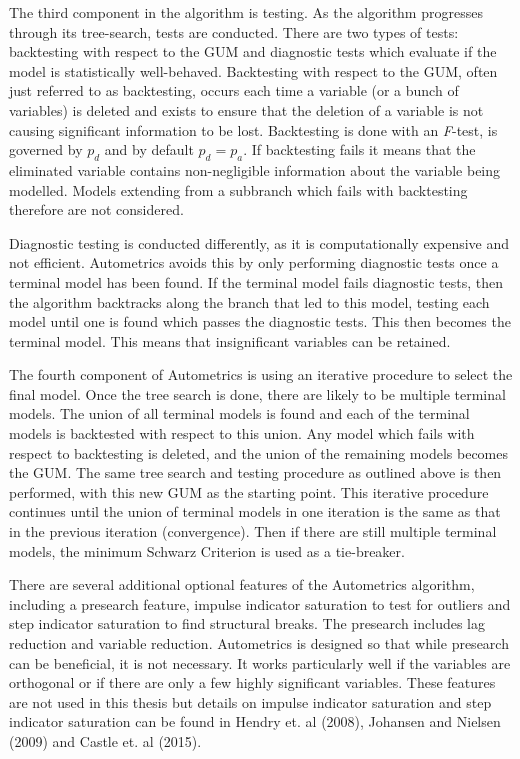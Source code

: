The third component in the algorithm is testing. As the algorithm progresses through its tree-search, tests are conducted. There are two types of tests: backtesting with respect to the GUM and diagnostic tests which evaluate if the model is statistically well-behaved. Backtesting with respect to the GUM, often just referred to as backtesting, occurs each time a variable (or a bunch of variables) is deleted and exists to ensure that the deletion of a variable is not causing significant information to be lost. Backtesting is done with an \textit{F}-test, is governed by $p_{d}$ and by default $p_{d} = p_{a}$. If backtesting fails it means that the eliminated variable contains non-negligible information about the variable being modelled. Models extending from a subbranch which fails with backtesting therefore are not considered.


Diagnostic testing is conducted differently, as it is computationally expensive and not efficient. Autometrics avoids this by only performing diagnostic tests once a terminal model has been found. If the terminal model fails diagnostic tests, then the algorithm backtracks along the branch that led to this model, testing each model until one is found which passes the diagnostic tests. This then becomes the terminal model. This means that insignificant variables can be retained.

The fourth component of Autometrics is using an iterative procedure to select the final model. Once the tree search is done, there are likely to be multiple terminal models. The union of all terminal models is found and each of the terminal models is backtested with respect to this union. Any model which fails with respect to backtesting is deleted, and the union of the remaining models becomes the GUM. The same tree search and testing procedure as outlined above is then performed, with this new GUM as the starting point. This iterative procedure continues until the union of terminal models in one iteration is the same as that in the previous iteration (convergence). Then if there are still multiple terminal models, the minimum Schwarz Criterion is used as a tie-breaker. 

There are several additional optional features of the Autometrics algorithm, including a presearch feature,  impulse indicator saturation to test for outliers and step indicator saturation to find structural breaks.  The presearch includes lag reduction and variable reduction. Autometrics is designed so that while presearch can be beneficial, it is not necessary. It works particularly well if the variables are orthogonal or if there are only a few highly significant variables. These features are not used in this thesis but details on impulse indicator saturation and step indicator saturation can be found in Hendry et. al (2008), Johansen and Nielsen (2009) and Castle et. al (2015). 

